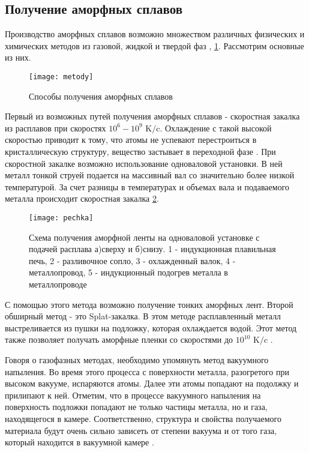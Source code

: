 \subsection{Получение аморфных сплавов}
Производство аморфных сплавов возможно множеством различных физических и химических  методов  из газовой, жидкой и твердой фаз \cite{Glezer}, \ref{metody}. Рассмотрим основные из них.
\begin{figure}[h!]
	\begin{center}
		\texttt{[image: metody]}{}{}{}
		\caption{Способы получения аморфных сплавов \cite{Sudzuki}}
		\label{metody}
	\end{center}
\end{figure}


Первый из возможных путей получения аморфных сплавов - скоростная закалка из расплавов при скоростях $10^6-10^9\text{ K/c}$. Охлаждение с такой высокой скоростью приводит к тому, что атомы не успевают перестроиться в кристаллическую структуру, вещество застывает в переходной фазе \cite{Abrosimova}. При скоростной закалке возможно использование одноваловой установки. В ней металл тонкой струей подается на массивный вал со значительно более низкой температурой. За счет разницы в температурах и объемах вала и подаваемого металла происходит скоростная закалка \ref{pech}.
\begin{figure}[h!]
	\begin{center}
		\texttt{[image: pechka]}{}{}{}
		\caption{Схема получения аморфной ленты на одноваловой установке с подачей расплава а)сверху и б)снизу. 1 - индукционная плавильная печь, 2 - разливочное сопло, 3 - охлажденный валок, 4 - металлопровод, 5 - индукционный подогрев металла в металлопроводе \cite{Danilova}}
		\label{pech}
	\end{center}
\end{figure}
С помощью этого метода возможно получение тонких аморфных лент.
Второй обширный метод - это Splat-закалка. В этом методе расплавленный металл выстреливается из пушки на подложку, которая охлаждается водой. Этот метод также позволяет получать аморфные пленки со скоростями до $10^{10}\text{ K/c}$ \cite{Davies}.

Говоря о газофазных методах, необходимо упомянуть метод вакуумного напыления. Во время этого процесса  с поверхности металла, разогретого при высоком вакууме, испаряются атомы.  Далее эти атомы попадают на подолжку и прилипают к ней. Отметим, что в процессе вакуумного напыления на поверхность подложки попадают не только частицы металла, но и газа, находящегося в камере. Соответственно, структура и свойства получаемого материала будут очень сильно зависеть от степени вакуума и от того газа, который находится в вакуумной камере \cite{Sudzuki}.

